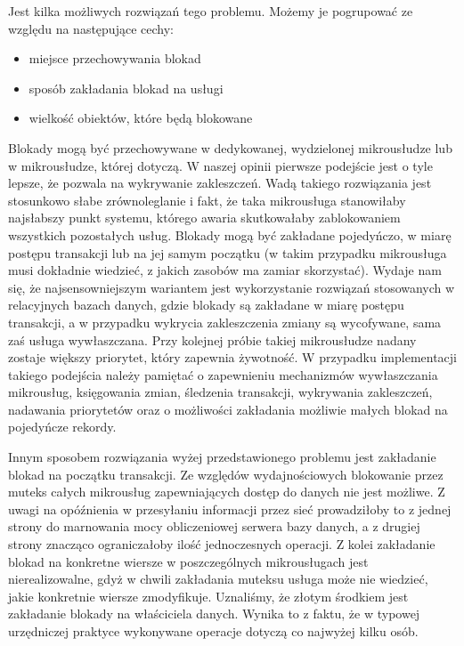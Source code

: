 \documentclass[licencjacka]{pracamgr}
\begin{document}
Jest kilka możliwych rozwiązań tego problemu. Możemy je pogrupować ze względu na następujące cechy:
\begin{itemize}
	\item miejsce przechowywania blokad
	\item sposób zakładania blokad na usługi
	\item wielkość obiektów, które będą blokowane
\end{itemize}
Blokady mogą być przechowywane w dedykowanej, wydzielonej mikrousłudze lub w mikrousłudze, której dotyczą. W naszej opinii
pierwsze podejście jest o tyle lepsze, że pozwala na wykrywanie zakleszczeń. Wadą takiego rozwiązania jest
stosunkowo słabe zrównoleglanie i fakt, że taka mikrousługa stanowiłaby najsłabszy punkt systemu, którego awaria
skutkowałaby zablokowaniem wszystkich pozostałych usług. Blokady mogą być zakładane pojedyńczo, w miarę
postępu transakcji lub na jej samym początku (w takim przypadku mikrousługa musi dokładnie wiedzieć, z jakich
zasobów ma zamiar skorzystać). Wydaje nam się, że najsensowniejszym wariantem jest wykorzystanie rozwiązań
stosowanych w relacyjnych bazach danych, gdzie blokady są zakładane w miarę postępu transakcji, a w przypadku
wykrycia zakleszczenia zmiany są wycofywane, sama zaś usługa wywłaszczana. Przy kolejnej próbie takiej mikrousłudze
nadany zostaje większy priorytet, który zapewnia żywotność. W przypadku implementacji takiego podejścia należy
pamiętać o zapewnieniu mechanizmów wywłaszczania mikrousług, księgowania zmian, śledzenia transakcji, wykrywania
zakleszczeń, nadawania priorytetów oraz o możliwości zakładania możliwie małych blokad na pojedyńcze rekordy.

Innym sposobem rozwiązania wyżej przedstawionego problemu jest zakładanie blokad na początku transakcji.
Ze względów wydajnościowych blokowanie przez muteks
całych mikrousług zapewniających dostęp do danych nie jest możliwe. Z uwagi na opóźnienia w przesyłaniu informacji
przez sieć prowadziłoby to z jednej strony do marnowania mocy obliczeniowej serwera bazy danych, a z drugiej strony
znacząco ograniczałoby ilość jednoczesnych operacji. Z kolei zakładanie blokad na konkretne wiersze w poszczególnych
mikrousługach jest nierealizowalne, gdyż w chwili zakładania muteksu usługa może nie wiedzieć, jakie konkretnie
wiersze zmodyfikuje. Uznaliśmy, że złotym środkiem jest zakładanie blokady na właściciela danych. Wynika to z
faktu, że w typowej urzędniczej praktyce wykonywane operacje dotyczą co najwyżej kilku osób.
\end{document}
